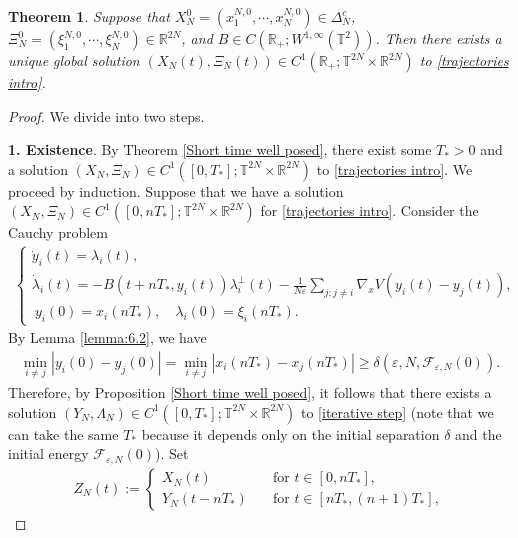 \documentclass[11pt,reqno]{amsart}
\newtheorem{thm}{Theorem}[section]
\numberwithin{equation}{section}
\begin{document}
\begin{thm}
Suppose that $X_{N}^{0}=(x_{1}^{N,0},\cdots\!,x_{N}^{N,0})\in \Delta_{N}^{c}$,
$\Xi_{N}^{0}=(\xi_{1}^{N,0},\cdots\!,\xi_{N}^{N,0})\in \mathbb{R}^{2N}$, 
and $B\in C(\mathbb{R}_{+};W^{1,\infty}(\mathbb{T}^{2}))$. 
Then there exists a unique global solution $(X_{N}(t),\Xi_{N}(t))\in C^{1}(\mathbb{R}_{+}; \mathbb{T}^
{2N}\times \mathbb{R}^{2N})$ to \eqref{trajectories intro}.    
\end{thm}
\begin{proof}  We divide into two steps.

\smallskip
\textbf{1. Existence}.
By 
Theorem \ref{Short time well posed}, there exist some $T_{\ast}>0$ and a solution $(X_{N},\Xi_{N})\in C^{1}([0,T_{\ast}];\mathbb{T}^{2N}\times \mathbb{R}^{2N})$ to \eqref{trajectories intro}. We proceed by induction. Suppose that we have a solution $(X_{N},\Xi_{N})\in C^{1}([0,nT_{\ast}];\mathbb{T}^{2N}\times \mathbb{R}^{2N})$ for \eqref{trajectories intro}. Consider the  Cauchy problem 
\begin{align}
\begin{cases}
\dot y_{i}(t)=\lambda_{i}(t),\\[1mm]
\dot \lambda_{i}(t)=-B(t+nT_{\ast},y_{i}(t))\lambda_{i}^{\perp}(t)-\frac{1}{N\varepsilon}\underset{j:j\neq i}{\sum}\nabla_{x}V(y_{i}(t)-y_{j}(t)),\\
\ y_{i}(0)=x_{i}(nT_{\ast}),\quad \lambda_{i}(0)=\xi_{i}(nT_{\ast}). 
\end{cases} \label{iterative step}   
\end{align}
By Lemma \ref{lemma:6.2}, we have
\begin{align*}
\min_{i\neq j}\left\vert y_{i}(0)-y_{j}(0)\right\vert=\min_{i\neq j}\left\vert x_{i}(nT_{\ast})-x_{j}(nT_{\ast})\right\vert\geq \delta(\varepsilon,N,\mathcal{F}_{\varepsilon,N}(0)).      
\end{align*}
Therefore, by Proposition \ref{Short time well posed}, 
it follows that there exists a solution 
$(Y_{N},\Lambda_{N})\in C^{1}([0,T_{\ast}];\mathbb{T}^{2N}\times \mathbb{R}^{2N})$ 
to \eqref{iterative step} 
(note that we can take the same $T_{\ast}$ because it depends only on the initial separation $\delta$ and the initial energy $\mathcal{F}_{\varepsilon,N}(0)$). Set 
\begin{align*}
Z_{N}(t):=\begin{cases}
X_{N}(t) &\quad \mbox{for $t\in [0,nT_{\ast}]$},\\
Y_{N}(t-nT_{\ast})&\quad \mbox{for $t\in [nT_{\ast},(n+1)T_{\ast}]$},
\end{cases}

\end{align*}
\end{proof}
\end{document}
